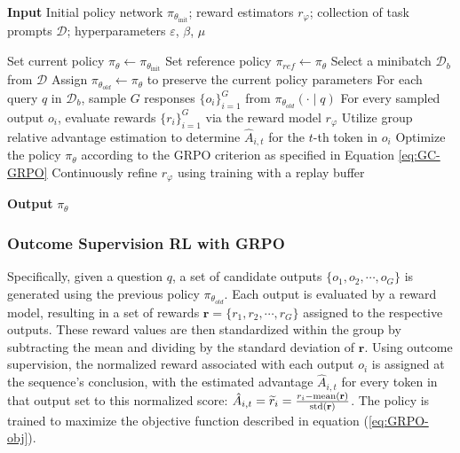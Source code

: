 \begin{itemize}[topsep=0pt]
\begin{itemize}[topsep=0pt]
\begin{algorithm}[t]
  \small
  \caption{Iterative Group Relative Policy Optimization}
  \textbf{Input} Initial policy network $\pi_{\theta_{\text{init}}}$; reward estimators $r_\varphi$; collection of task prompts $\mathcal{D}$;
  hyperparameters $\varepsilon$, $\beta$, $\mu$
  \begin{algorithmic}[1]
    \State Set current policy $\pi_\theta \leftarrow \pi_{\theta_{\text{init}}}$
       \State Set reference policy $\pi_{ref} \leftarrow \pi_{\theta}$
        \State Select a minibatch $\mathcal{D}_b$ from $\mathcal{D}$
        \State Assign $\pi_{\theta_{old}} \leftarrow \pi_{\theta}$ to preserve the current policy parameters
        \State For each query $q$ in $\mathcal{D}_b$, sample $G$ responses $\{o_i\}_{i=1}^G$ from $\pi_{\theta_{old}} (\cdot \mid q)$ 
        \State For every sampled output $o_i$, evaluate rewards $\{r_i\}_{i=1}^{G}$ via the reward model $r_{\varphi}$
        \State Utilize group relative advantage estimation to determine $\hat{A}_{i,t}$ for the $t$-th token in $o_i$
          \State Optimize the policy $\pi_{\theta}$ according to the GRPO criterion as specified in Equation \ref{eq:GC-GRPO}
        \EndFor
      \EndFor
      \State Continuously refine $r_\varphi$ using training with a replay buffer
    \EndFor
  \end{algorithmic}
  \textbf{Output} $\pi_\theta$
  \label{alg:iter-grpo}
\end{algorithm}

\subsubsection{Outcome Supervision RL with GRPO} Specifically, given a question $q$, a set of candidate outputs $\{o_1, o_2, \cdots, o_G\}$ is generated using the previous policy $\pi_{\theta_{old}}$. Each output is evaluated by a reward model, resulting in a set of rewards $\mathbf{r}=\{r_1, r_2, \cdots, r_G\}$ assigned to the respective outputs. These reward values are then standardized within the group by subtracting the mean and dividing by the standard deviation of $\mathbf{r}$. Using outcome supervision, the normalized reward associated with each output $o_i$ is assigned at the sequence's conclusion, with the estimated advantage $\hat{A}_{i, t}$ for every token in that output set to this normalized score: $\hat{A}_{i, t} = \widetilde{r}_i = \frac{r_i- {\rm mean}(\mathbf{r})}{{\rm std}(\mathbf{r})}$. The policy is trained to maximize the objective function described in equation (\ref{eq:GRPO-obj}).


\end{itemize}
\end{itemize}
